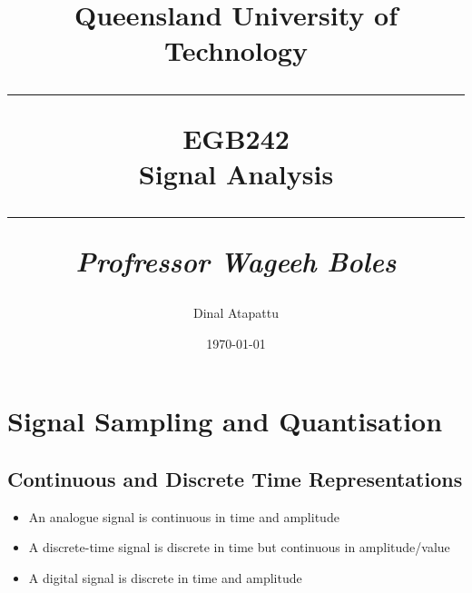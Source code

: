 \documentclass[oneside]{book}
\begin{document}
\pagestyle{fancy}
    \fancyhf{}
\fancyhead[R]{\nouppercase{\leftmark}}
\renewcommand{\footrulewidth}{0.4pt}
    \title{
            Queensland University of Technology\\
            \rule{\linewidth}{0.5pt}
        \centering
        \textbf{EGB242} \\
        Signal Analysis\\
        \vspace{0.4cm}
        \rule{\linewidth}{1.5pt}
        \small{\textit{Profressor Wageeh Boles}}
    }
    \author{Dinal Atapattu}
    \date{\today}
    \maketitle
    \thispagestyle{empty}
    \tableofcontents
    \chapter{Signal Sampling and Quantisation}
        \section{Continuous and Discrete Time Representations}
            \begin{itemize}
                \item An analogue signal is continuous in time and amplitude
                \item A discrete-time signal is discrete in time but continuous in amplitude/value
                \item A digital signal is discrete in time and amplitude
            \end{itemize}
\end{document}
